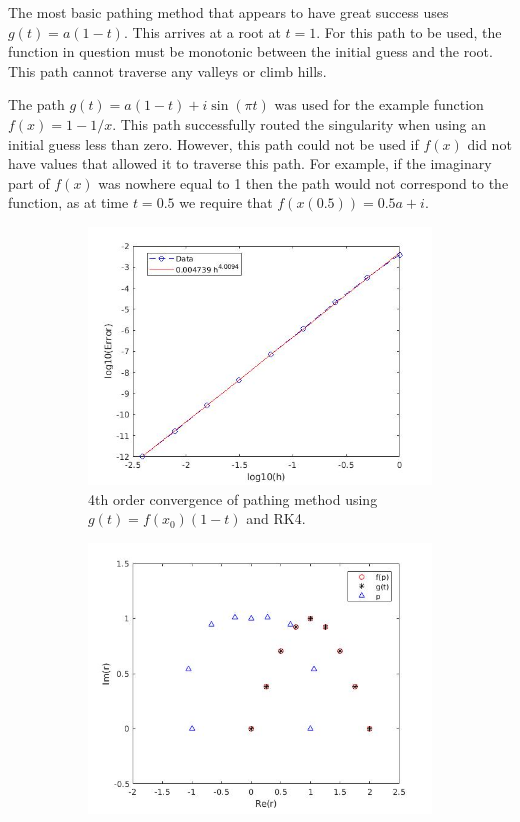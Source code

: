 \documentclass{book}
\begin{document}
The most basic pathing method that appears to have great success uses $g(t) = a (1-t)$.
This arrives at a root at $t=1$.
For this path to be used, the function in question must be monotonic between the initial guess and the root.
This path cannot traverse any valleys or climb hills.

The path $g(t) = a (1-t) + i \sin(\pi t)$ was used for the example function $f(x) = 1 - 1/x$.
This path successfully routed the singularity when using an initial guess less than zero.
However, this path could not be used if $f(x)$ did not have values that allowed it to traverse this path.
For example, if the imaginary part of $f(x)$ was nowhere equal to 1 then the path would not correspond to the function, as at time $t=0.5$ we require that $f(x(0.5)) = 0.5 a + i$.

\begin{figure}
	\begin{subfigure}{0.5\textwidth}
		\includegraphics[width=\textwidth]{PMexp1_01.jpg}
		\caption{4th order convergence of pathing method using $g(t) = f(x_0) (1 - t)$ and RK4.}
	\end{subfigure}
	\begin{subfigure}{0.5\textwidth}
		\includegraphics[width=\textwidth]{PMexp2_01.jpg}

\end{subfigure}
\end{figure}
\end{document}
